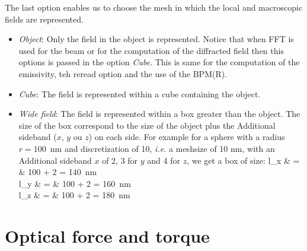 The last option enables us to choose the mesh in which the local and
macroscopic fields are represented.

\begin{itemize}

\item {\it Object}: Only the field in the object is
  represented. Notice that when FFT is used for the beam or for the
  computation of the diffracted field then this options is passed in
  the option {\it Cube}. This is same for the computation of the
  emissivity, teh reread option and the use of the BPM(R).

\item {\it Cube}: The field is represented within a cube containing
  the object.

\item {\it Wide field}: The field is represented within a box greater
  than the object.  The size of the box correspond to the size of the
  object plus the Additional sideband ($x$, $y$ ou $z$) on each
  side. For example for a sphere with a radius $r=100$~nm and
  discretization of 10, {\it i.e.} a meshsize of 10 nm, with an
  Additional sideband $x$ of 2, 3 for $y$ and 4 for $z$, we get a box
  of size:
  \be l_x & = & 100 + 2  = 140~{\rm nm} \\
  l_y & = & 100 + 2  = 160~{\rm nm} \\
  l_z & = & 100 + 2  = 180~{\rm nm} \\
  \ee
\end{itemize}

\section{Optical force and torque}

